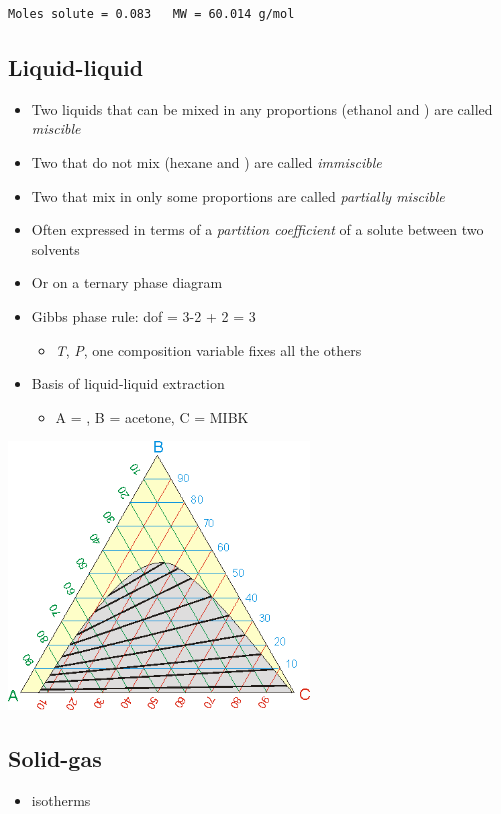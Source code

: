 \documentclass[11pt]{article}
\begin{document}
\begin{verbatim}
Moles solute = 0.083   MW = 60.014 g/mol
\end{verbatim}

\subsection{Liquid-liquid}
\label{sec-8-6}
\begin{itemize}
\item Two liquids that can be mixed in any proportions (ethanol and ) are called \emph{miscible}
\item Two that do not mix (hexane and ) are called \emph{immiscible}
\item Two that mix in only some proportions are called \emph{partially miscible}
\item Often expressed in terms of a \emph{partition coefficient} of a solute between two solvents
\item Or on a ternary phase diagram
\item Gibbs phase rule: dof = 3-2 + 2 = 3
\begin{itemize}
\item \emph{T}, \emph{P}, one composition variable fixes all the others
\end{itemize}
\item Basis of liquid-liquid extraction
\begin{itemize}
\item A = , B = acetone, C = MIBK
\end{itemize}
\end{itemize}

\includegraphics[width=0.6\textwidth]{./figs/Ternary.png}

\subsection{Solid-gas}
\label{sec-8-7}
\begin{itemize}
\item isotherms
\end{itemize}
\end{document}
